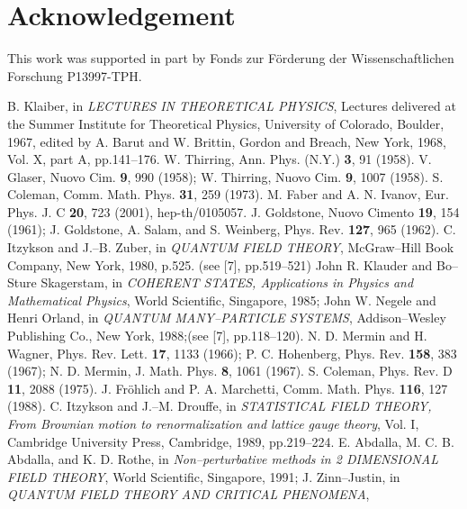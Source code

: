 \documentclass[a4paper,12pt] {article}
\begin{document}
\section*{Acknowledgement}

\hspace{0.2in} This work was supported in part by Fonds zur
F\"orderung der Wissenschaftlichen Forschung P13997-TPH.



\newpage


\begin{thebibliography}{9}
\bibitem{[1]}
B. Klaiber, 
in {\it LECTURES IN THEORETICAL PHYSICS},
Lectures delivered at the Summer Institute for Theoretical Physics,
University of Colorado, Boulder, 1967, edited by A. Barut and
W. Brittin, Gordon and Breach, New York, 1968, Vol. X, 
part A, pp.141--176.
\bibitem{[2]}
W. Thirring, 
Ann. Phys. (N.Y.) {\bf 3}, 91 (1958).
\bibitem{[3]}
V. Glaser,
Nuovo Cim. {\bf 9}, 990 (1958);
W. Thirring,
Nuovo Cim. {\bf 9}, 1007 (1958).
\bibitem{[4]}
S. Coleman,
Comm. Math. Phys. {\bf 31}, 259 (1973).
\bibitem{[5]}
M. Faber and A. N. Ivanov,
Eur. Phys. J. C {\bf 20}, 723 (2001), hep-th/0105057.
\bibitem{[6]}
J. Goldstone,
Nuovo Cimento {\bf 19}, 154 (1961);
J. Goldstone, A. Salam, and S. Weinberg,
Phys. Rev. {\bf 127}, 965 (1962). 
\bibitem{[7]}
C. Itzykson and J.--B. Zuber,
in {\it QUANTUM FIELD THEORY}, McGraw--Hill Book Company, 
New York, 1980, p.525.
\bibitem{[8]}
(see [7], pp.519--521)
\bibitem{[9]}
John R. Klauder and Bo--Sture Skagerstam,
in {\it COHERENT STATES, Applications in Physics 
and Mathematical Physics}, World Scientific, Singapore, 1985;
John W. Negele and Henri Orland, 
in {\it QUANTUM MANY--PARTICLE SYSTEMS}, 
Addison--Wesley Publishing Co., New York, 1988;(see [7], pp.118--120).
\bibitem{[10]} 
N. D. Mermin and H. Wagner, 
Phys. Rev. Lett. {\bf 17},
1133 (1966);
P. C. Hohenberg,
Phys. Rev. {\bf 158}, 383 (1967);
N. D. Mermin,
J. Math. Phys. {\bf 8}, 1061 (1967).
\bibitem{[11]}
S. Coleman,
Phys. Rev. D {\bf 11}, 2088 (1975).
\bibitem{[12]}
J. Fr\"ohlich and P. A. Marchetti,
Comm. Math. Phys. {\bf 116}, 127 (1988).
\bibitem{[13]}
C. Itzykson and J.--M. Drouffe,
in {\it STATISTICAL FIELD THEORY, From Brownian motion to 
renormalization and lattice gauge theory}, Vol. I, Cambridge 
University Press, Cambridge, 1989, pp.219--224.
\bibitem{[14]}
E. Abdalla, M. C. B. Abdalla, and K. D. Rothe,
in {\it Non--perturbative methods in 2 DIMENSIONAL FIELD THEORY},
World Scientific, Singapore, 1991;
J. Zinn--Justin,
in {\it QUANTUM FIELD THEORY AND CRITICAL PHENOMENA},

\end{thebibliography}
\end{document}
